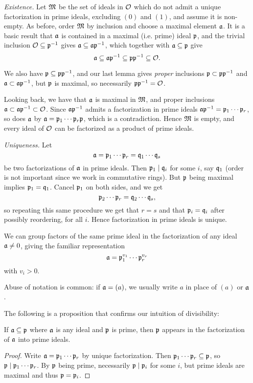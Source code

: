 \emph{Existence.} Let $\mathfrak{M}$ be the set of ideals in $\mathcal{O}$ which do not admit a unique factorization in prime ideals, excluding $(0)$ and $(1)$, and assume it is non-empty. As before, order $\mathfrak{M}$ by inclusion and choose a maximal element $\mathfrak{a}$. It is a basic result that $\mathfrak{a}$ is contained in a maximal (i.e. prime) ideal $\mathfrak{p}$, and the trivial inclusion $\mathcal{O}\subseteq\mathfrak{p}^{-1}$ gives $\mathfrak{a}\subseteq\mathfrak{a}\mathfrak{p}^{-1}$, which together with $\mathfrak{a}\subseteq\mathfrak{p}$ give
\[
	\mathfrak{a}\subseteq\mathfrak{a}\mathfrak{p}^{-1}\subseteq\mathfrak{p}\mathfrak{p}^{-1}\subseteq\mathcal{O}.
\]

We also have $\mathfrak{p}\subseteq\mathfrak{p}\mathfrak{p}^{-1}$, and our last lemma gives \emph{proper} inclusions $\mathfrak{p}\subset\mathfrak{p}\mathfrak{p}^{-1}$ and $\mathfrak{a}\subset\mathfrak{a}\mathfrak{p}^{-1}$, but $\mathfrak{p}$ is maximal, so necessarily $\mathfrak{p}\mathfrak{p}^{-1}=\mathcal{O}$.

Looking back, we have that $\mathfrak{a}$ is maximal in $\mathfrak{M}$, and proper inclusions $\mathfrak{a}\subset\mathfrak{a}\mathfrak{p}^{-1}\subset\mathcal{O}$. Since $\mathfrak{a}\mathfrak{p}^{-1}$ admits a factorization in prime ideals $\mathfrak{a}\mathfrak{p}^{-1}=\mathfrak{p}_1\cdots\mathfrak{p}_r$, so does $\mathfrak{a}$ by $\mathfrak{a}=\mathfrak{p}_1\cdots\mathfrak{p}_r\mathfrak{p}$, which is a contradiction. Hence $\mathfrak{M}$ is empty, and every ideal of $\mathcal{O}$ can be factorized as a product of prime ideals.

\emph{Uniqueness.} Let
\[
	\mathfrak{a} = \mathfrak{p}_1\cdots\mathfrak{p}_r = \mathfrak{q}_1\cdots\mathfrak{q}_s
\]
be two factorizations of $\mathfrak{a}$ in prime ideals. Then $\mathfrak{p}_1\mid\mathfrak{q}_i$ for some $i$, say $\mathfrak{q}_1$ (order is not important since we work in commutative rings). But $\mathfrak{p}$ being maximal implies $\mathfrak{p}_1=\mathfrak{q}_1$. Cancel $\mathfrak{p}_1$ on both sides, and we get
\[
	\mathfrak{p}_2\cdots\mathfrak{p}_r = \mathfrak{q}_2\cdots\mathfrak{q}_s,
\]
so repeating this same procedure we get that $r=s$ and that $\mathfrak{p}_i=\mathfrak{q}_i$ after possibly reordering, for all $i$. Hence factorization in prime ideals is unique.

We can group factors of the same prime ideal in the factorization of any ideal $\mathfrak{a}\neq 0$, giving the familiar representation
\[
	\mathfrak{a} = \mathfrak{p}_1^{v_1}\cdots\mathfrak{p}_r^{v_r}
\]
with $v_i>0$.

Abuse of notation is common: if $\mathfrak{a}=(a)$, we usually write $a$ in place of $(a)$ or $\mathfrak{a}$.

The following is a proposition that confirms our intuition of divisibility:

\begin{proposition}
	If $\mathfrak{a}\subseteq\mathfrak{p}$ where $\mathfrak{a}$ is any ideal and $\mathfrak{p}$ is prime, then $\mathfrak{p}$ appears in the factorization of $\mathfrak{a}$ into prime ideals.
\end{proposition}
\begin{proof}
	Write $\mathfrak{a}=\mathfrak{p}_1\cdots\mathfrak{p}_r$ by unique factorization. Then $\mathfrak{p}_1\cdots\mathfrak{p}_r\subseteq\mathfrak{p}$, so $\mathfrak{p}\mid\mathfrak{p}_1\cdots\mathfrak{p}_r$. By $\mathfrak{p}$ being prime, necessarily $\mathfrak{p}\mid\mathfrak{p}_i$ for some $i$, but prime ideals are maximal and thus $\mathfrak{p}=\mathfrak{p}_i$.
\end{proof}

